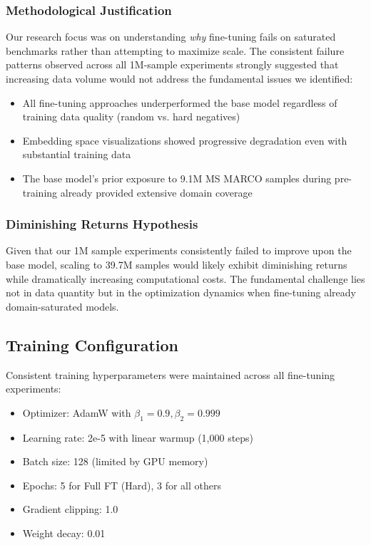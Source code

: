 \documentclass[conference]{IEEEtran}
\begin{document}
\subsubsection{Methodological Justification}
Our research focus was on understanding \textit{why} fine-tuning fails on saturated benchmarks rather than attempting to maximize scale. The consistent failure patterns observed across all 1M-sample experiments strongly suggested that increasing data volume would not address the fundamental issues we identified:
\begin{itemize}
\item All fine-tuning approaches underperformed the base model regardless of training data quality (random vs. hard negatives)
\item Embedding space visualizations showed progressive degradation even with substantial training data
\item The base model's prior exposure to 9.1M MS MARCO samples during pre-training already provided extensive domain coverage
\end{itemize}

\subsubsection{Diminishing Returns Hypothesis}
Given that our 1M sample experiments consistently failed to improve upon the base model, scaling to 39.7M samples would likely exhibit diminishing returns while dramatically increasing computational costs. The fundamental challenge lies not in data quantity but in the optimization dynamics when fine-tuning already domain-saturated models.

\subsection{Training Configuration}
Consistent training hyperparameters were maintained across all fine-tuning experiments:
\begin{itemize}
\item Optimizer: AdamW with $\beta_1=0.9, \beta_2=0.999$
\item Learning rate: 2e-5 with linear warmup (1,000 steps)
\item Batch size: 128 (limited by GPU memory)
\item Epochs: 5 for Full FT (Hard), 3 for all others
\item Gradient clipping: 1.0
\item Weight decay: 0.01
\end{itemize}
\end{document}
